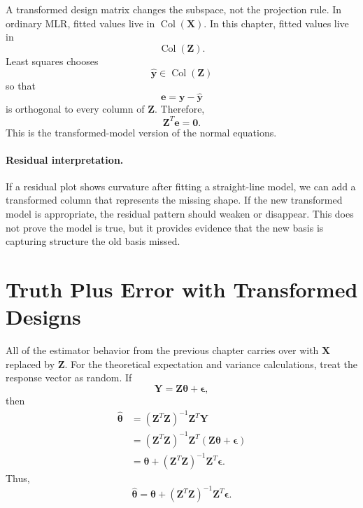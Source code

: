 A transformed design matrix changes the subspace, not the projection rule.  In ordinary MLR, fitted values live in \(\operatorname{Col}(\mathbf{X})\).  In this chapter, fitted values live in
\begin{equation}
  \operatorname{Col}(\mathbf{Z}).
\end{equation}
Least squares chooses
\begin{equation}
  \widehat{\mathbf{y}}\in\operatorname{Col}(\mathbf{Z})
\end{equation}
so that
\begin{equation}
  \mathbf{e}=\mathbf{y}-\widehat{\mathbf{y}}
\end{equation}
is orthogonal to every column of \(\mathbf{Z}\).  Therefore,
\begin{equation}
  \mathbf{Z}^T\mathbf{e}=\mathbf{0}.
\end{equation}
This is the transformed-model version of the normal equations.

\paragraph{Residual interpretation.}
If a residual plot shows curvature after fitting a straight-line model, we can add a transformed column that represents the missing shape.  If the new transformed model is appropriate, the residual pattern should weaken or disappear.  This does not prove the model is true, but it provides evidence that the new basis is capturing structure the old basis missed.

\section{Truth Plus Error with Transformed Designs}

All of the estimator behavior from the previous chapter carries over with \(\mathbf{X}\) replaced by \(\mathbf{Z}\).  For the theoretical expectation and variance calculations, treat the response vector as random.  If
\begin{equation}
  \mathbf{Y}=\mathbf{Z}\boldsymbol{\theta}+\boldsymbol{\epsilon},
\end{equation}
then
\begin{align}
  \widehat{\boldsymbol{\theta}}
  &=(\mathbf{Z}^T\mathbf{Z})^{-1}\mathbf{Z}^T\mathbf{Y} \\
  &=(\mathbf{Z}^T\mathbf{Z})^{-1}\mathbf{Z}^T(\mathbf{Z}\boldsymbol{\theta}+\boldsymbol{\epsilon}) \\
  &=\boldsymbol{\theta}+(\mathbf{Z}^T\mathbf{Z})^{-1}\mathbf{Z}^T\boldsymbol{\epsilon}.
\end{align}
Thus,
\begin{equation}
  \boxed{
  \widehat{\boldsymbol{\theta}}
  =\boldsymbol{\theta}+(\mathbf{Z}^T\mathbf{Z})^{-1}\mathbf{Z}^T\boldsymbol{\epsilon}.
  }
\end{equation}

